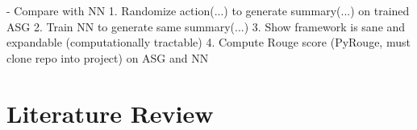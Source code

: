 \documentclass[12pt,twoside]{report}
\theoremstyle{definition}
\begin{document}
- Compare with NN
    1. Randomize action(...) to generate summary(...) on trained ASG
    2. Train NN to generate same summary(...)
    3. Show framework is sane and expandable (computationally tractable)
    4. Compute Rouge score (PyRouge, must clone repo into project) on ASG and NN

\chapter{Literature Review}


\begin{appendices}


\end{appendices}



\pagestyle{PageNum}
\end{document}
